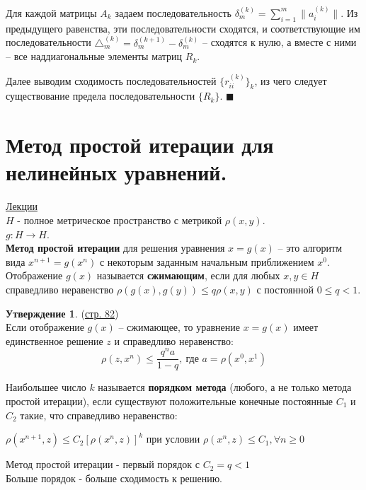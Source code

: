 \documentclass[specialist, subf, href, colorlinks=true, 12pt, times, mtpro, final]{disser}
\theoremstyle{definition}
\newtheorem{state}{Утверждение}[section]
\begin{document}
{Для каждой матрицы $A_k$ задаем последовательность $\delta^{(k)}_m = \sum\limits^m_{i=1} \|a^{(k)}_i\|$. Из предыдущего равенства, эти последовательности сходятся, и соответствующие им последовательности $\triangle^{(k)}_m = \delta^{(k+1)}_m - \delta^{(k)}_m$ \--- сходятся к нулю, а вместе с ними \--- все наддиагональные элементы матриц $R_k$.

Далее выводим сходимость последовательностей $\{r^{(k)}_{ii}\}_k$, из чего следует существование предела последовательности $\{R_k\}$. $\blacksquare$



\section {Метод простой итерации для нелинейных уравнений.}
    \hyperlink {lects.82}{Лекции}\\
$H$  - полное метрическое пространство с метрикой $\rho(x,y)$.\\
$g:H \rightarrow H$.\\
\textbf{Метод простой итерации} для решения уравнения $x = g(x)$ \--- это алгоритм вида $x^{n+1} = g(x^n)$ с некоторым заданным начальным приближением $x^0$.\\
Отображение $g(x)$ называется \textbf{сжимающим}, если для любых $x, y \in H$ справедливо неравенство $\rho(g(x), g(y)) \leq q\rho(x,y)$ с постоянной $0 \leq q < 1$.
\begin{state} (\hyperlink {lects.82}{стр. 82})\\
Если отображение $g(x)$ \--- сжимающее, то уравнение $x=g(x)$  имеет единственное решение $z$ и справедливо неравенство:
$$
\rho (z, x^n) \leq \frac{q^na}{1-q},\  \text{где } a = \rho (x^0, x^1)
$$
\end{state}

Наибольшее число $k$ называется \textbf{порядком метода} (любого, а не только метода простой итерации), если существуют положительные конечные постоянные $C_1$ и $C_2$ такие, что справедливо неравенство:
\begin{center}
$\rho(x^{n+1}, z) \leq C_2 [\rho(x^n,z)]^k$ 
при условии
 $ \rho (x^n,z) \leq C_1, \forall n \geq 0$
\end{center}

Метод простой итерации - первый порядок с $C_2 = q < 1$\\
Больше порядок - больше сходимость к решению.
    

}
\end{document}
